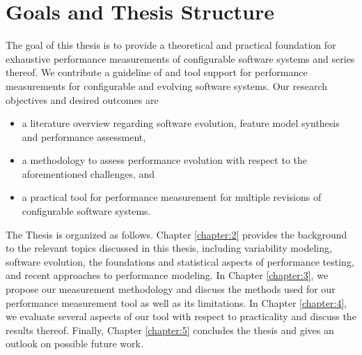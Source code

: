 





\section{Goals and Thesis Structure}

The goal of this thesis is to provide a theoretical and practical foundation for
exhaustive performance measurements of configurable software systems and series
thereof. We contribute a guideline of and tool support for performance
measurements for configurable and evolving software systems. Our research
objectives and desired outcomes are

\begin{itemize}
\item a literature overview regarding software evolution, feature model
synthesis and performance assessment,
\item a methodology to assess performance evolution with respect to the
aforementioned challenges, and
\item a practical tool for performance measurement for multiple revisions of
configurable software systems.
\end{itemize}

The Thesis is organized as follows. Chapter \ref{chapter:2} provides the
background to the relevant topics discussed in this thesis, including
variability modeling, software evolution, the foundations and statistical
aspects of performance testing, and recent approaches to performance modeling. In
Chapter \ref{chapter:3}, we propose our measurement methodology and discuss
the methods used for our performance measurement tool as well as its
limitations. In Chapter \ref{chapter:4}, we evaluate several aspects of our
tool with respect to practicality and discuss the results thereof. Finally,
Chapter \ref{chapter:5} concludes the thesis and gives an outlook on possible
future work.
